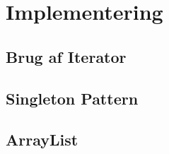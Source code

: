 \chapter{Implementering}\label{chap:Implementering}

\section{Brug af Iterator}

\section{Singleton Pattern}

\section{ArrayList}